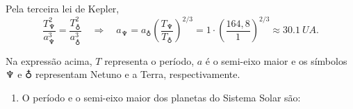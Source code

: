 \documentclass[a4paper]{article}
\newcommand\myrightarrow{\quad\Rightarrow\quad}
\begin{document}
\begin{resolucoes}
  \begin{exercicio}
   Pela terceira lei de Kepler,
  \begin{equation*}
  \frac{T_{\neptune}^2}{a_{\neptune}^3} = \frac{T_{\earth}^2}{a_{\earth}^3} \myrightarrow a_{\neptune} = a_{\earth} \left(\frac{T_{\neptune}}{T_{\earth}}\right)^{2/3} = 1 \cdot \left(\frac{164,8}{1}\right)^{2/3} \approx \SI{30.1}{UA}.
  \end{equation*}
  
  Na expressão acima, $T$ representa o período, $a$ é o semi-eixo maior e os símbolos $\neptune$ e $\earth$ representam Netuno e a Terra, respectivamente.
  \end{exercicio}
  
  \begin{exercicio}
  
  \begin{enumerate}
  \item O período e o semi-eixo maior dos planetas do Sistema Solar são:
  

\end{enumerate}
\end{exercicio}
\end{resolucoes}
\end{document}
